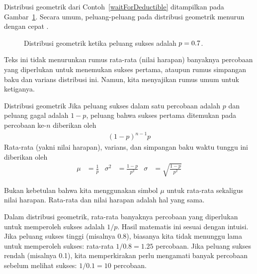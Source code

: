 Distribusi geometrik dari Contoh~\ref{waitForDeductible} ditampilkan pada
Gambar~\ref{geometricDist70}. Secara umum, peluang-peluang pada distribusi
geometrik menurun dengan cepat .

\begin{figure}[h]
  \centering
  \caption{Distribusi geometrik ketika peluang sukses adalah
      $p = 0.7{}$.}
  \label{geometricDist70}
\end{figure}

Teks ini tidak menurunkan rumus rata-rata (nilai harapan) banyaknya
percobaan yang diperlukan untuk menemukan sukses pertama, ataupun rumus
simpangan baku dan varians distribusi ini. Namun, kita menyajikan rumus
umum untuk ketiganya.

\begin{onebox}{Distribusi geometrik}
  Jika peluang sukses dalam satu percobaan adalah $p$ dan peluang gagal
  adalah $1-p$, peluang bahwa sukses pertama ditemukan pada percobaan
  ke-$n$ diberikan oleh\vspace{-1.5mm}
  \begin{align*}
  (1-p)^{n-1}p
  \end{align*}
  Rata-rata (yakni nilai harapan), varians, dan simpangan baku waktu
  tunggu ini diberikan oleh
  \begin{align*}
  \mu &= \frac{1}{p}
      &\sigma^2 &=\frac{1-p}{p^2}
      &\sigma &= \sqrt{\frac{1-p}{p^2}}
  \end{align*}
\end{onebox}

Bukan kebetulan bahwa kita menggunakan simbol $\mu$ untuk rata-rata
sekaligus nilai harapan. Rata-rata dan nilai harapan adalah hal yang sama.

Dalam distribusi geometrik, rata-rata banyaknya percobaan yang diperlukan
untuk memperoleh sukses adalah $1/p$. Hasil matematis ini sesuai dengan
intuisi. Jika peluang sukses tinggi (misalnya 0.8), biasanya kita tidak
menunggu lama untuk memperoleh sukses: rata-rata $1/0.8 = 1.25$ percobaan.
Jika peluang sukses rendah (misalnya 0.1), kita memperkirakan perlu
mengamati banyak percobaan sebelum melihat sukses: $1/0.1 = 10$ percobaan.

